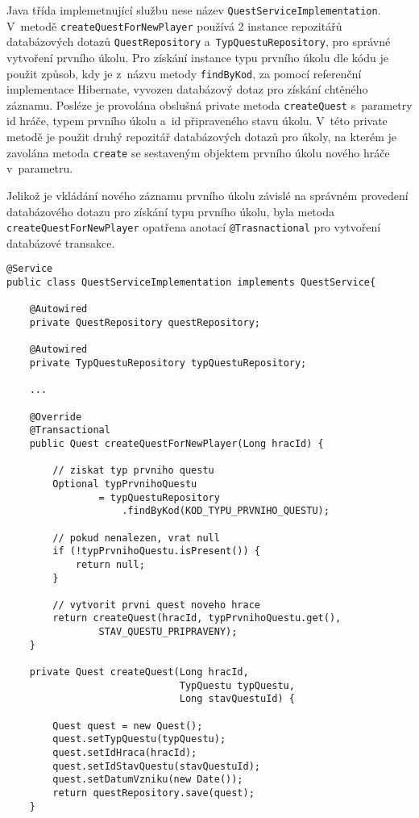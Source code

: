 \documentclass[twoside, 12pt]{article}
\begin{document}
{Java třída implemetnující službu nese název \texttt{QuestServiceImplementation}.
V~metodě \texttt{createQuestForNewPlayer} používá 2 instance repozitářů databázových dotazů
\texttt{QuestRepository} a~\texttt{TypQuestuRepository}, pro správné vytvoření prvního úkolu.
Pro získání instance typu prvního úkolu dle kódu je použit způsob, kdy je z~názvu metody \texttt{findByKod},
za pomocí referenční implementace Hibernate, vyvozen databázový dotaz pro získání chtěného záznamu.
Posléze je provolána obslušná private metoda \texttt{createQuest} s~parametry id hráče, typem prvního úkolu a~id připraveného stavu úkolu.
V~této private metodě je použit druhý repozitář databázových dotazů pro úkoly,
na kterém je zavolána metoda \texttt{create} se sestaveným objektem prvního úkolu nového hráče v~parametru.

Jelikož je vkládání nového záznamu prvního úkolu závislé na správném provedení databázového dotazu pro získání typu prvního úkolu,
byla metoda\texttt{ createQuestForNewPlayer} opatřena anotací \texttt{@Trasnactional} pro vytvoření databázové transakce.

\begin{lstlisting}
@Service
public class QuestServiceImplementation implements QuestService{

    @Autowired
    private QuestRepository questRepository;

    @Autowired
    private TypQuestuRepository typQuestuRepository;

    ...

    @Override
    @Transactional
    public Quest createQuestForNewPlayer(Long hracId) {

        // ziskat typ prvniho questu
        Optional typPrvnihoQuestu
                = typQuestuRepository
                    .findByKod(KOD_TYPU_PRVNIHO_QUESTU);

        // pokud nenalezen, vrat null
        if (!typPrvnihoQuestu.isPresent()) {
            return null;
        }

        // vytvorit prvni quest noveho hrace
        return createQuest(hracId, typPrvnihoQuestu.get(),
                STAV_QUESTU_PRIPRAVENY);
    }

    private Quest createQuest(Long hracId,
                              TypQuestu typQuestu,
                              Long stavQuestuId) {

        Quest quest = new Quest();
        quest.setTypQuestu(typQuestu);
        quest.setIdHraca(hracId);
        quest.setIdStavQuestu(stavQuestuId);
        quest.setDatumVzniku(new Date());
        return questRepository.save(quest);
    }


\end{lstlisting}}
\end{document}
